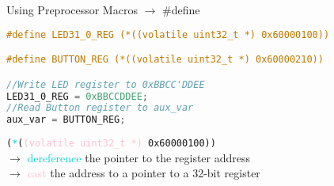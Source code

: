 \begin{examplecode}{Using Preprocessor Macros} $\rightarrow$ \#define
\begin{lstlisting}[language=C, style=basesmol]
#define LED31_0_REG (*((volatile uint32_t *) 0x60000100))

#define BUTTON_REG (*((volatile uint32_t *) 0x60000210))

//Write LED register to 0xBBCC'DDEE
LED31_0_REG = 0xBBCCDDEE;
//Read Button register to aux_var
aux_var = BUTTON_REG;
\end{lstlisting}
    \vspace{2mm}
    \texttt{(\textcolor{darkturquoise}{*}(\textcolor{pink}{(volatile\ uint32\_t *)} 0x60000100))}\\
    $\rightarrow$ \textcolor{darkturquoise}{dereference} the pointer to the register address\\
    $\rightarrow$ \textcolor{pink}{cast} the address to a pointer to a 32-bit register
\end{examplecode}